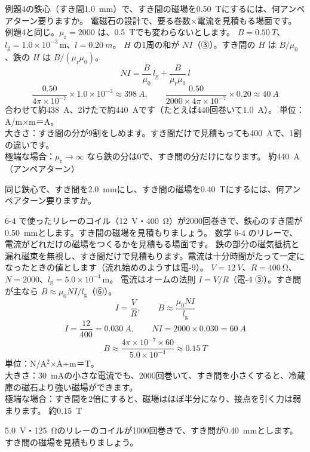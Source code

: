 \label{ph:電-7:ex5}
\begin{phreidai}[すき間に決まった磁場をつくる]
例題4の鉄心（すき間\qty{1.0}{mm}）で、すき間の磁場を\qty{0.50}{T}にするには、何アンペアターン要りますか。
\phbamen
電磁石の設計で、要る巻数×電流を見積もる場面です。
\phmushi
例題4と同じ。$\mu_{\mathrm r}=2000$ は、\qty{0.5}{T}でも変わらないとします。
\phzu
$B=\qty{0.50}{T}$、$l_{\mathrm g}=1.0\times10^{-3}$\,m、$l=\qty{0.20}{m}$。
\phriyu
$H$ の1周の和が $NI$（③）。すき間の $H$ は $B/\mu_0$、鉄の $H$ は $B/(\mu_{\mathrm r}\mu_0)$。
\phtateru
\[NI=\frac{B}{\mu_0}\,l_{\mathrm g}+\frac{B}{\mu_{\mathrm r}\mu_0}\,l\]
\phtoku
\[\frac{0.50}{4\pi\times10^{-7}}\times1.0\times10^{-3}\approx\qty{398}{A},\qquad\frac{0.50}{2000\times4\pi\times10^{-7}}\times0.20\approx\qty{40}{A}\]
合わせて約\qty{438}{A}、2けたで約\qty{440}{A}です（たとえば440回巻いて\qty{1.0}{A}）。
\phtashikame
単位：A/m×m＝A。\\
大きさ：すき間の分が9割をしめます。すき間だけで見積もっても\qty{400}{A}で、1割の違いです。\\
極端な場合：$\mu_{\mathrm r}\to\infty$ なら鉄の分は0で、すき間の分だけになります。
\kotae 約\qty{440}{A}（アンペアターン）
\end{phreidai}
\begin{jibun}
同じ鉄心で、すき間を\qty{2.0}{mm}にし、すき間の磁場を\qty{0.40}{T}にするには、何アンペアターン要りますか。
\end{jibun}

\label{ph:電-7:ex6}
\begin{phreidai}[リレーの電磁石]
6-4 で使ったリレーのコイル（\qty{12}{V}・\qty{400}{\ohm}）が2000回巻きで、鉄心のすき間が\qty{0.50}{mm}とします。すき間の磁場を見積もりましょう。
\phbamen
数学 6-4 のリレーで、電流がどれだけの磁場をつくるかを見積もる場面です。
\phmushi
鉄の部分の磁気抵抗と漏れ磁束を無視し、すき間だけで見積もります。電流は十分時間がたって一定になったときの値とします（流れ始めのようすは電-9）。
\phzu
$V=\qty{12}{V}$、$R=\qty{400}{\ohm}$、$N=2000$、$l_{\mathrm g}=5.0\times10^{-4}$\,m。
\phriyu
電流はオームの法則 $I=V/R$（電-4 ③）。すき間が主なら $B\approx\mu_0NI/l_{\mathrm g}$（⑥）。
\phtateru
\[I=\frac VR,\qquad B\approx\frac{\mu_0NI}{l_{\mathrm g}}\]
\phtoku
\[I=\frac{12}{400}=\qty{0.030}{A},\qquad NI=2000\times0.030=\qty{60}{A}\]
\[B\approx\frac{4\pi\times10^{-7}\times60}{5.0\times10^{-4}}\approx\qty{0.15}{T}\]
\phtashikame
単位：N/A$^2$×A÷m＝T。\\
大きさ：\qty{30}{mA}の小さな電流でも、2000回巻いて、すき間を小さくすると、冷蔵庫の磁石より強い磁場ができます。\\
極端な場合：すき間を2倍にすると、磁場はほぼ半分になり、接点を引く力は弱まります。
\kotae 約\qty{0.15}{T}
\end{phreidai}
\begin{jibun}
\qty{5.0}{V}・\qty{125}{\ohm}のリレーのコイルが1000回巻きで、すき間が\qty{0.40}{mm}とします。すき間の磁場を見積もりましょう。
\end{jibun}

